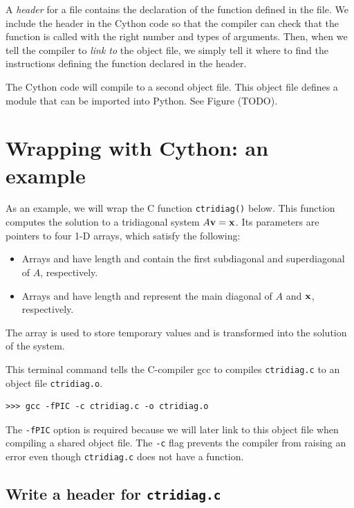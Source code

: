 A \emph{header} for a file contains the declaration of the function defined in the file.
We include the header in the Cython code so that the compiler can check that the function is called with the right number and types of arguments.
Then, when we tell the compiler to \emph{link to} the object file, we simply tell it where to find the instructions defining the function declared in the header.

The Cython code will compile to a second object file.
This object file defines a module that can be imported into Python. See Figure (TODO).


\section*{Wrapping with Cython: an example}
As an example, we will wrap the C function \texttt{ctridiag()} below.
This function computes the solution to a tridiagonal system $A{\bf v} = {\bf x}$.
Its parameters are pointers to four 1-D arrays, which satisfy the following:
\begin{itemize}
\item Arrays  and  have length  and contain the first subdiagonal and superdiagonal of $A$, respectively.
\item Arrays  and  have length  and represent the main diagonal of $A$ and ${\bf x}$, respectively.
\end{itemize}
The array  is used to store temporary values and  is transformed into the solution of the system.



This terminal command tells the C-compiler gcc to compiles \texttt{ctridiag.c} to an object file \texttt{ctridiag.o}.

\begin{lstlisting}
>>> gcc -fPIC -c ctridiag.c -o ctridiag.o
\end{lstlisting}
The \texttt{-fPIC} option is required because we will later link to this object file when compiling a shared object file.
The \texttt{-c} flag prevents the compiler from raising an error even though \texttt{ctridiag.c} does not have a  function.




\subsection*{Write a header for \texttt{ctridiag.c}}

